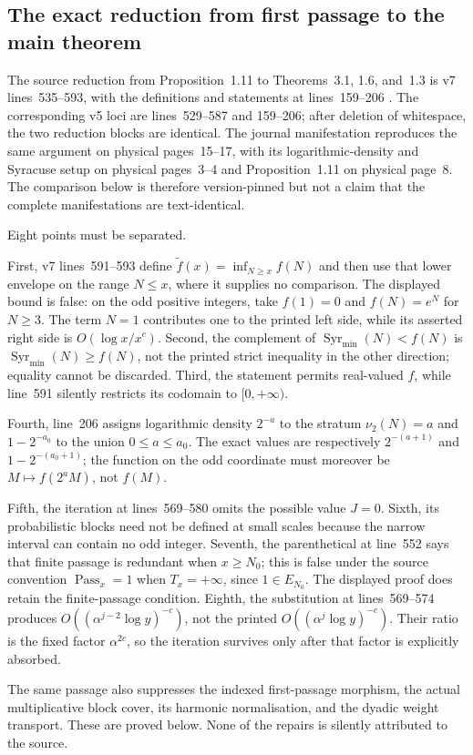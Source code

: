 \subsection{The exact reduction from first passage to the main theorem}
\label{subsec:Tao-main-reduction}

The source reduction from Proposition~1.11 to Theorems~3.1, 1.6, and~1.3
is v7 lines~535--593, with the definitions and statements at lines~159--206
\cite{Tao2026v7}.  The corresponding v5 loci are lines~529--587 and
159--206; after deletion of whitespace, the two reduction blocks are
identical.  The journal manifestation reproduces the same argument on
physical pages~15--17, with its logarithmic-density and Syracuse setup on
physical pages~3--4 and Proposition~1.11 on physical page~8.  The comparison
below is therefore version-pinned but not a claim that the complete
manifestations are text-identical.

\begin{sourceissue}
\label{sourceissue:Tao-main-reduction}
Eight points must be separated.

First, v7 lines~591--593 define
\(\widetilde f(x)=\inf_{N\geq x}f(N)\) and then use that lower envelope on
the range \(N\leq x\), where it supplies no comparison.  The displayed
bound is false: on the odd positive integers, take \(f(1)=0\) and
\(f(N)=e^N\) for \(N\geq3\).  The term \(N=1\) contributes one to the
printed left side, while its asserted right side is
\(O(\log x/x^c)\).  Second, the complement of
\(\operatorname{Syr}_{\min}(N)<f(N)\) is
\(\operatorname{Syr}_{\min}(N)\geq f(N)\), not the printed strict
inequality in the other direction; equality cannot be discarded.  Third,
the statement permits real-valued \(f\), while line~591 silently restricts
its codomain to \([0,+\infty)\).

Fourth, line~206 assigns logarithmic density \(2^{-a}\) to the stratum
\(\nu_2(N)=a\) and \(1-2^{-a_0}\) to the union
\(0\leq a\leq a_0\).  The exact values are respectively
\(2^{-(a+1)}\) and \(1-2^{-(a_0+1)}\); the function on the odd coordinate
must moreover be \(M\mapsto f(2^aM)\), not \(f(M)\).

Fifth, the iteration at lines~569--580 omits the possible value \(J=0\).
Sixth, its probabilistic blocks need not be defined at small scales because
the narrow interval can contain no odd integer.  Seventh, the parenthetical
at line~552 says that finite passage is redundant when \(x\geq N_0\); this
is false under the source convention \(\operatorname{Pass}_x=1\) when
\(T_x=+\infty\), since \(1\in E_{N_0}\).  The displayed proof does retain
the finite-passage condition.  Eighth, the substitution at lines~569--574
produces
\(O((\alpha^{j-2}\log y)^{-c})\), not the printed
\(O((\alpha^j\log y)^{-c})\).  Their ratio is the fixed factor
\(\alpha^{2c}\), so the iteration survives only after that factor is
explicitly absorbed.

The same passage also suppresses the indexed first-passage morphism, the
actual multiplicative block cover, its harmonic normalisation, and the
dyadic weight transport.  These are proved below.  None of the repairs is
silently attributed to the source.
\end{sourceissue}

